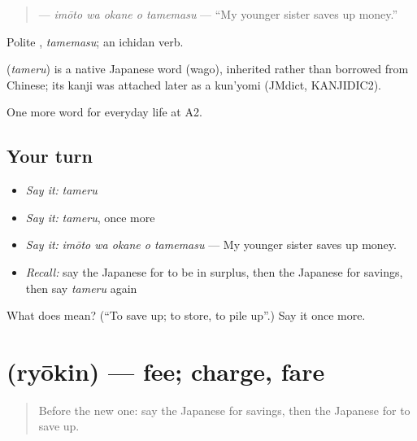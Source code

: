 \begin{quote}
\textbf{  } — \emph{imōto wa okane o tamemasu} — \textquotedblleft{}My younger sister saves up money.\textquotedblright{}
\end{quote}

Polite \textbf{}, \emph{tamemasu}; an ichidan verb.

\begin{cousinweb}
\textbf{} (\emph{tameru}) is a native Japanese word (wago), inherited rather than borrowed from Chinese; its kanji was attached later as a kun'yomi (JMdict, KANJIDIC2).
\end{cousinweb}

\begin{grammarlens}[title={What you've built}]
One more word for everyday life at A2.
\end{grammarlens}

\subsection*{Your turn}
\begin{itemize}
\raggedright
  \item \emph{Say it:} \emph{tameru}
  \item \emph{Say it:} \emph{tameru}, once more
  \item \emph{Say it:} \emph{imōto wa okane o tamemasu} — My younger sister saves up money.
  \item \emph{Recall:} say the Japanese for to be in surplus, then the Japanese for savings, then say \emph{tameru} again
\end{itemize}

\begin{tcolorbox}[breakable,colback=teal!4,colframe=teal!35!black,title={Before you move on}]
What does  mean? (\textquotedblleft{}To save up; to store, to pile up\textquotedblright{}.) Say it once more.
\end{tcolorbox}
\section[\texorpdfstring{\ja{りょうきん} (ryōkin)}{りょうきん (ryōkin)}]{ (ryōkin) — fee; charge, fare}

\label{lesson:JA-C186-ryoukin}



\begin{quote}
Before the new one: say the Japanese for savings, then the Japanese for to save up.
\end{quote}

